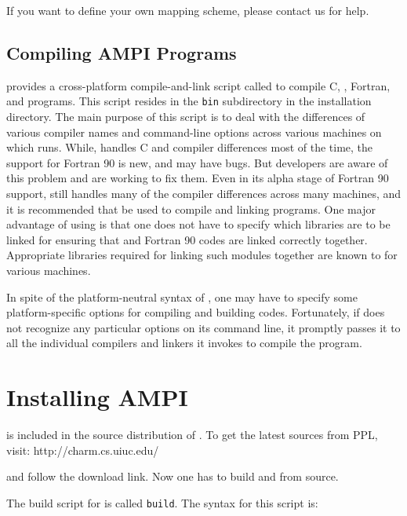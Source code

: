 \documentclass[10pt]{article}
\begin{document}
If you want to define your own mapping scheme, please contact us for help.

\subsection{Compiling AMPI Programs}

\charmpp{} provides a cross-platform compile-and-link script called \charmc{}
to compile C, \CC{}, Fortran, \charmpp{} and \ampi{} programs.  This script
resides in the \texttt{bin} subdirectory in the \charmpp{} installation
directory. The main purpose of this script is to deal with the differences of
various compiler names and command-line options across various machines on
which \charmpp{} runs. While, \charmc{} handles C and \CC{} compiler
differences most of the time, the support for Fortran 90 is new, and may have
bugs. But \charmpp{} developers are aware of this problem and are working to
fix them. Even in its alpha stage of Fortran 90 support, \charmc{} still
handles many of the compiler differences across many machines, and it is
recommended that \charmc{} be used to compile and linking \ampi{} programs. One
major advantage of using \charmc{} is that one does not have to specify which
libraries are to be linked for ensuring that \CC{} and Fortran 90 codes are
linked correctly together. Appropriate libraries required for linking such
modules together are known to \charmc{} for various machines.

In spite of the platform-neutral syntax of \charmc{}, one may have to specify
some platform-specific options for compiling and building \ampi{} codes.
Fortunately, if \charmc{} does not recognize any particular options on its
command line, it promptly passes it to all the individual compilers and linkers
it invokes to compile the program.

\appendix

\section{Installing AMPI}

\ampi{} is included in the source distribution of \charmpp{}. 
To get the latest sources from PPL, visit:
	http://charm.cs.uiuc.edu/

and follow the download link.
Now one has to build \charmpp{} and \ampi{} from source.

The build script for \charmpp{} is called \texttt{build}. The syntax for this
script is:
\end{document}
